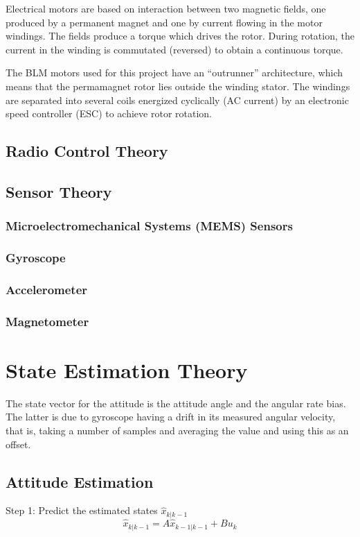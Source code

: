 \documentclass[a4paper]{report}
\begin{document}
Electrical motors are based on interaction between two magnetic fields, one produced by a permanent magnet and one by current flowing in the motor windings. The fields produce a torque which drives the rotor. During rotation, the current in the winding is commutated (reversed) to obtain a continuous torque.

The BLM motors used for this project have an “outrunner” architecture, which means that the permamagnet rotor lies outside the winding stator. The windings are separated into several coils energized cyclically (AC current) by an electronic speed controller (ESC) to achieve rotor rotation.

	\section{Radio Control Theory}

	\section{Sensor Theory}

		\subsection{Microelectromechanical Systems (MEMS) Sensors}

		\subsection{Gyroscope}

		\subsection{Accelerometer}

		\subsection{Magnetometer}

\chapter{State Estimation Theory}
The state vector for the attitude is the attitude angle and the angular rate bias. The latter is due to gyroscope having a drift in its measured angular velocity, that is, taking a number of samples and averaging the value and using this as an offset.
	\section{Attitude Estimation}
		Step 1: Predict the estimated states $\hat{x}_{k|k-1}$
		\begin{equation}
		\hat{x}_{k|k-1}=A\hat{x}_{k-1|k-1}+Bu_{k}
		\end{equation}
\end{document}
